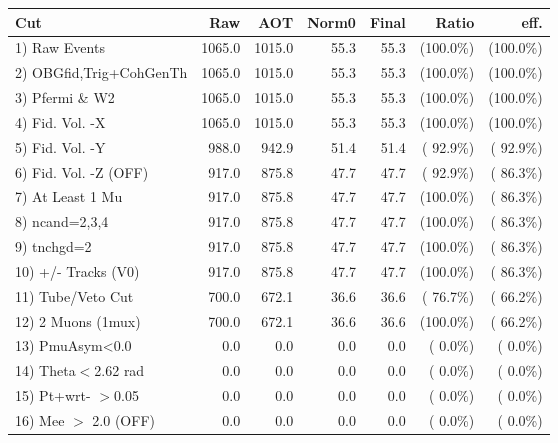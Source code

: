  \begin{table}[h!]\centering
 \begin{tabular}{||l||r|r|r|r|r|r||}
 \hline
 \hline
 Cut & Raw & AOT & Norm0 & Final & Ratio & eff.       \\
 \hline
  1) Raw Events           &       1065.0 &       1015.0 &         55.3 &         55.3 & (100.0\%) & (100.0\%) \\
  2) OBGfid,Trig+CohGenTh &       1065.0 &       1015.0 &         55.3 &         55.3 & (100.0\%) & (100.0\%) \\
  3) Pfermi \& W2         &       1065.0 &       1015.0 &         55.3 &         55.3 & (100.0\%) & (100.0\%) \\
  4) Fid. Vol. -X         &       1065.0 &       1015.0 &         55.3 &         55.3 & (100.0\%) & (100.0\%) \\
  5) Fid. Vol. -Y         &        988.0 &        942.9 &         51.4 &         51.4 & ( 92.9\%) & ( 92.9\%) \\
  6) Fid. Vol. -Z (OFF)   &        917.0 &        875.8 &         47.7 &         47.7 & ( 92.9\%) & ( 86.3\%) \\
  7) At Least 1 Mu        &        917.0 &        875.8 &         47.7 &         47.7 & (100.0\%) & ( 86.3\%) \\
  8) ncand=2,3,4          &        917.0 &        875.8 &         47.7 &         47.7 & (100.0\%) & ( 86.3\%) \\
  9) tnchgd=2             &        917.0 &        875.8 &         47.7 &         47.7 & (100.0\%) & ( 86.3\%) \\
 10) +/- Tracks (V0)      &        917.0 &        875.8 &         47.7 &         47.7 & (100.0\%) & ( 86.3\%) \\
 11) Tube/Veto Cut        &        700.0 &        672.1 &         36.6 &         36.6 & ( 76.7\%) & ( 66.2\%) \\
 12) 2 Muons (1mux)       &        700.0 &        672.1 &         36.6 &         36.6 & (100.0\%) & ( 66.2\%) \\
 13) PmuAsym<0.0          &          0.0 &          0.0 &          0.0 &          0.0 & (  0.0\%) & (  0.0\%) \\
 14) Theta$<$2.62 rad     &          0.0 &          0.0 &          0.0 &          0.0 & (  0.0\%) & (  0.0\%) \\
 15) Pt+wrt- $>$0.05      &          0.0 &          0.0 &          0.0 &          0.0 & (  0.0\%) & (  0.0\%) \\
 16) Mee $>$ 2.0  (OFF)   &          0.0 &          0.0 &          0.0 &          0.0 & (  0.0\%) & (  0.0\%) \\

\end{tabular}
\end{table}
